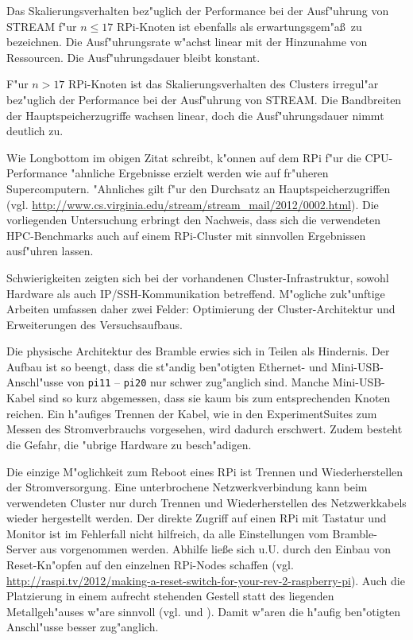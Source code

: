 Das Skalierungsverhalten bez"uglich der Performance bei der Ausf"uhrung von STREAM f"ur $n\leq 17$ RPi-Knoten ist ebenfalls als erwartungsgem"a\ss\ zu bezeichnen. Die Ausf"uhrungsrate w"achst linear mit der Hinzunahme von Ressourcen. Die Ausf"uhrungsdauer bleibt konstant. 

F"ur $n>17$ RPi-Knoten ist das Skalierungsverhalten des Clusters irregul"ar bez"uglich der Performance bei der Ausf"uhrung von STREAM. Die Bandbreiten der Hauptspeicherzugriffe wachsen linear, doch die Ausf"uhrungsdauer nimmt deutlich zu. 

\noindent
Wie Longbottom im obigen Zitat schreibt, k"onnen auf dem RPi f"ur die CPU-Performance "ahnliche Ergebnisse erzielt werden wie auf fr"uheren Supercomputern. "Ahnliches gilt f"ur den Durchsatz an Hauptspeicherzugriffen (vgl. \url{http://www.cs.virginia.edu/stream/stream_mail/2012/0002.html}). Die vorliegenden Untersuchung erbringt den Nachweis, dass sich die verwendeten HPC-Benchmarks auch auf einem RPi-Cluster mit sinnvollen Ergebnissen ausf"uhren lassen. 

Schwierigkeiten zeigten sich bei der vorhandenen Cluster-Infrastruktur, sowohl Hardware als auch IP/SSH-Kommunikation betreffend. M"ogliche zuk"unftige Arbeiten umfassen daher zwei Felder: Optimierung der Cluster-Architektur und Erweiterungen des Versuchsaufbaus.

Die physische Architektur des Bramble erwies sich in Teilen als Hindernis. Der Aufbau ist so beengt, dass die st"andig ben"otigten Ethernet- und Mini-USB-Anschl"usse von \texttt{pi11} -- \texttt{pi20} nur schwer zug"anglich sind. Manche Mini-USB-Kabel sind so kurz abgemessen, dass sie kaum bis zum entsprechenden Knoten reichen. Ein h"aufiges Trennen der Kabel, wie in den ExperimentSuites zum Messen des Stromverbrauchs vorgesehen, wird dadurch erschwert. Zudem besteht die Gefahr, die "ubrige Hardware zu besch"adigen. 

Die einzige M"oglichkeit zum Reboot eines RPi ist Trennen und Wiederherstellen der Stromversorgung. Eine unterbrochene Netzwerkverbindung kann beim verwendeten Cluster nur durch Trennen und Wiederherstellen des Netzwerkkabels wieder hergestellt werden. Der direkte Zugriff auf einen RPi mit Tastatur und Monitor ist im Fehlerfall nicht hilfreich, da alle Einstellungen vom Bramble-Server aus vorgenommen werden. Abhilfe lie\ss e sich u.U. durch den Einbau von Reset-Kn"opfen auf den einzelnen RPi-Nodes schaffen (vgl. \url{http://raspi.tv/2012/making-a-reset-switch-for-your-rev-2-raspberry-pi}). Auch die Platzierung in einem aufrecht stehenden Gestell statt des liegenden Metallgeh"auses w"are sinnvoll (vgl. \cite{kie01} und \cite{cox13}). Damit w"aren die h"aufig ben"otigten Anschl"usse besser zug"anglich. 

